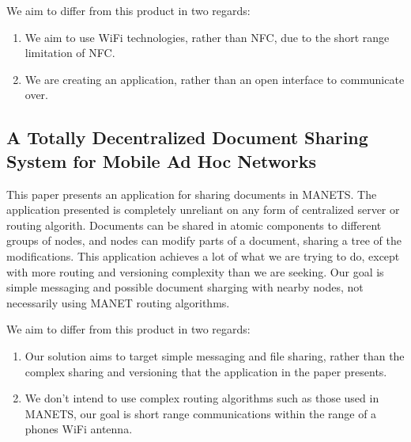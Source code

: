 \documentclass[10pt]{article}
\begin{document}
We aim to differ from this product in two regards:
\begin{enumerate}
    \item We aim to use WiFi technologies, rather than NFC, due to the short range limitation of NFC.
    \item We are creating an application, rather than an open interface to communicate over.
\end{enumerate}

\newpage

\subsection{A Totally Decentralized Document Sharing System for Mobile Ad Hoc Networks}
This paper  \cite{10.1145/1164783.1164805} presents an application for sharing documents in MANETS. The application presented
is completely unreliant on any form of centralized server or routing algorith. Documents can be shared in atomic components to different groups
of nodes, and nodes can modify parts of a document, sharing a tree of the modifications. This application achieves a lot of what we are trying to
do, except with more routing and versioning complexity than we are seeking. Our goal is simple messaging and possible document sharging with nearby
nodes, not necessarily using MANET routing algorithms.

We aim to differ from this product in two regards:
\begin{enumerate}
    \item Our solution aims to target simple messaging and file sharing, rather than the complex sharing and versioning that the application in the paper presents.
    \item We don't intend to use complex routing algorithms such as those used in MANETS, our goal is short range communications within the range of a phones WiFi antenna.
\end{enumerate}

\end{document}
